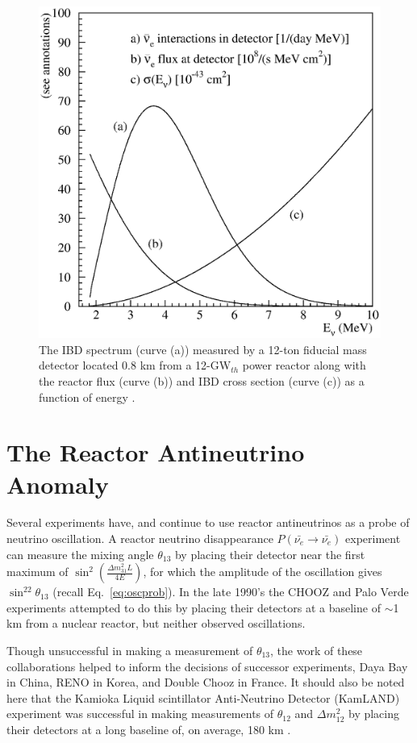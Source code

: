 \begin{figure}[!t]
	\centering
	\includegraphics[width=0.55\linewidth]{tex/3-reactorneutrinos-images/vogel-fig02}
	\caption{The IBD spectrum (curve (a)) measured by a 12-ton fiducial mass detector located 0.8 km from a 12-GW$_{th}$ power reactor along with the reactor flux (curve (b)) and IBD cross section (curve (c)) as a function of energy \cite{PDG}.}
	\label{fig:vogel-fig02}
\end{figure}


\section{The Reactor Antineutrino Anomaly}

Several experiments have, and continue to use reactor antineutrinos as a probe of neutrino oscillation. 
A reactor neutrino disappearance $P(\bar{\nu_{e}} \rightarrow \bar{\nu_{e}})$ experiment can measure the mixing angle $\theta_{13}$ by placing their detector near the first maximum of $\sin^2\left(\frac{\Delta m^2_{31}L}{4E}\right)$, for which the amplitude of the oscillation gives $\sin^22\theta_{13}$ (recall Eq.~\ref{eq:oscprob}).
In the late 1990's the CHOOZ \cite{Apollonio:1999ae,Apollonio:2002gd} and Palo Verde \cite{Boehm:2001ik} experiments attempted to do this by placing their detectors at a baseline of $\sim$1 km from a nuclear reactor, but neither observed oscillations.

Though unsuccessful in making a measurement of $\theta_{13}$, the work of these collaborations helped to inform the decisions of successor experiments, Daya Bay in China, RENO in Korea, and Double Chooz in France. 
It should also be noted here that the Kamioka Liquid scintillator Anti-Neutrino Detector (KamLAND) experiment was successful in making measurements of $\theta_{12}$ and $\Delta m^2_{12}$  by placing their detectors at a long baseline of, on average, 180 km \cite{Eguchi:2002dm, Araki:2004mb}.

